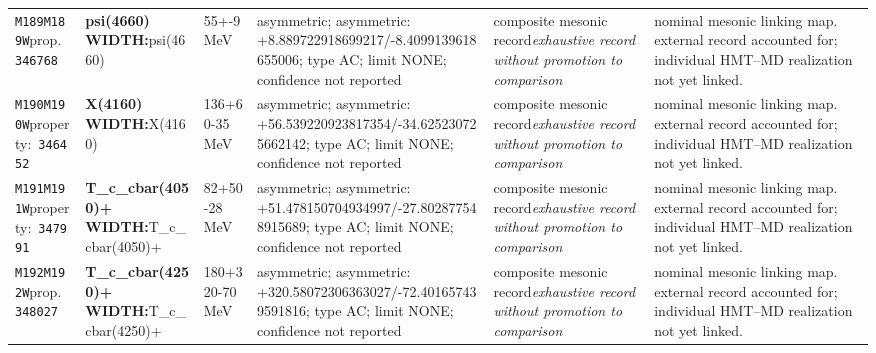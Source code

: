 \begin{landscape}
\begin{longtable}{L{1.85cm}L{4.45cm}L{2.35cm}L{4.05cm}L{3.35cm}L{7.15cm}}
\texttt{M189}\newline \texttt{M189W}\newline prop.\ \texttt{346768} & \textbf{psi(4660) WIDTH:}\newline psi(4660) & 55+-9\,MeV & asymmetric; asymmetric: +8.889722918699217/-8.4099139618655006; type AC; limit NONE; confidence not reported & composite mesonic record\newline \emph{exhaustive record without promotion to comparison} & nominal mesonic linking map. external record accounted for; individual HMT--MD realization not yet linked. \\
\texttt{M190}\newline \texttt{M190W}\newline property:\ \texttt{346452} & \textbf{X(4160) WIDTH:}\newline X(4160) & 136+60-35\,MeV & asymmetric; asymmetric: +56.539220923817354/-34.625230725662142; type AC; limit NONE; confidence not reported & composite mesonic record\newline \emph{exhaustive record without promotion to comparison} & nominal mesonic linking map. external record accounted for; individual HMT--MD realization not yet linked. \\
\texttt{M191}\newline \texttt{M191W}\newline property:\ \texttt{347991} & \textbf{T\_\allowbreak{}c\_\allowbreak{}cbar(4050)+ WIDTH:}\newline T\_\allowbreak{}c\_\allowbreak{}cbar(4050)+ & 82+50-28\,MeV & asymmetric; asymmetric: +51.478150704934997/-27.802877548915689; type AC; limit NONE; confidence not reported & composite mesonic record\newline \emph{exhaustive record without promotion to comparison} & nominal mesonic linking map. external record accounted for; individual HMT--MD realization not yet linked. \\
\texttt{M192}\newline \texttt{M192W}\newline prop.\ \texttt{348027} & \textbf{T\_\allowbreak{}c\_\allowbreak{}cbar(4250)+ WIDTH:}\newline T\_\allowbreak{}c\_\allowbreak{}cbar(4250)+ & 180+320-70\,MeV & asymmetric; asymmetric: +320.58072306363027/-72.401657439591816; type AC; limit NONE; confidence not reported & composite mesonic record\newline \emph{exhaustive record without promotion to comparison} & nominal mesonic linking map. external record accounted for; individual HMT--MD realization not yet linked. \\

\end{longtable}
\end{landscape}
